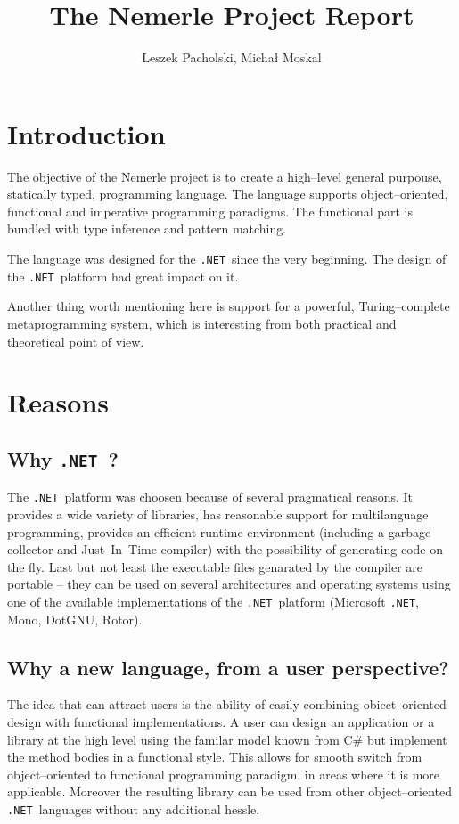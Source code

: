 \documentclass{article}
\title{The Nemerle Project Report}
\author{Leszek Pacholski, Micha{\l} Moskal}
\newcommand{\net}[0]{{\tt .NET}}
\begin{document}
\maketitle

\section{Introduction}

The objective of the Nemerle project is to create a high--level
general purpouse, statically typed, programming language. The language supports
object--oriented, functional and imperative programming paradigms.
The functional part is bundled with type inference and pattern matching.

The language was designed for the \net\ since the very beginning.
The design of the \net\ platform had great impact on it.

Another thing worth mentioning here is support for a powerful,
Turing--complete metaprogramming system, which is interesting from
both practical and theoretical point of view.

\section{Reasons}

\subsection{Why \net\ ?}

The \net\ platform was choosen because of several
pragmatical reasons. It provides a wide variety of libraries,
has reasonable support for multilanguage programming,
provides an efficient runtime environment (including a garbage
collector and Just--In--Time compiler) with the possibility
of generating code on the fly. Last but not least the executable
files genarated by the compiler are portable -- they can be used
on several architectures and operating systems using one
of the available implementations of the \net\ platform
(Microsoft \net, Mono, DotGNU, Rotor).

\subsection{Why a new language, from a user perspective?}

The idea that can attract users is the ability of easily
combining obiect--oriented design with functional implementations.
A user can design an application or a library at the high level using the
familar model known from C\# but implement the method bodies
in a functional style. This allows for smooth switch from object--oriented
to functional programming paradigm, in areas where it is more applicable.
Moreover the resulting library can be used from other object--oriented
\net\ languages without any additional hessle.
\end{document}
